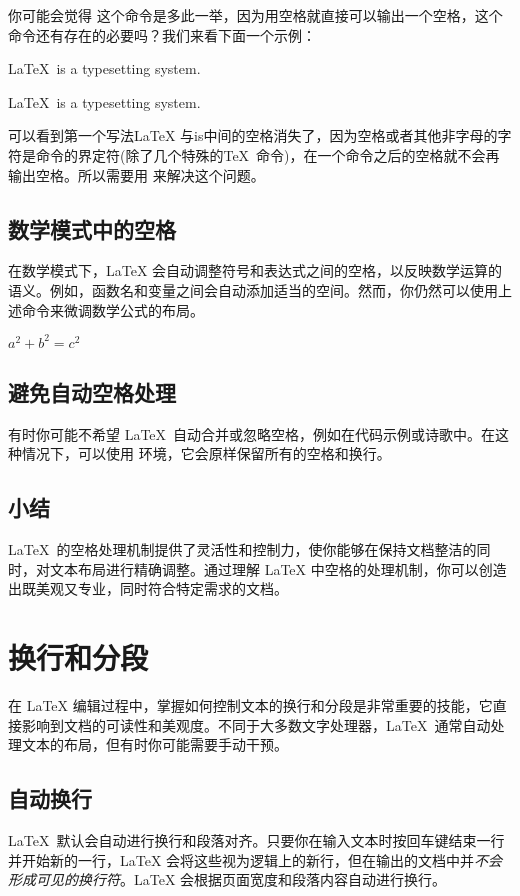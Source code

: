 {你可能会觉得\texinline{\|\textvisiblespace|} 这个命令是多此一举，因为用空格就直接可以输出一个空格，这个命令还有存在的必要吗？我们来看下面一个示例：
\begin{texlst}
	\LaTeX\ is a typesetting system.

	\LaTeX\ is a typesetting system.
\end{texlst}

可以看到第一个写法\LaTeX
与is中间的空格消失了，因为空格或者其他非字母的字符是命令的界定符(除了几个特殊的\TeX\
命令)，在一个命令之后的空格就不会再输出空格。所以需要用\texinline{\|\textvisiblespace|} 来解决这个问题。

\subsection{数学模式中的空格}
在数学模式下，LaTeX
会自动调整符号和表达式之间的空格，以反映数学运算的语义。例如，函数名和变量之间会自动添加适当的空间。然而，你仍然可以使用上述命令来微调数学公式的布局。
\begin{texlst}
$a^2+b^2=c^2$
\end{texlst}

\subsection{避免自动空格处理}
有时你可能不希望 \LaTeX\ 自动合并或忽略空格，例如在代码示例或诗歌中。在这种情况下，可以使用  环境，它会原样保留所有的空格和换行。

\subsection{小结}
\LaTeX\ 的空格处理机制提供了灵活性和控制力，使你能够在保持文档整洁的同时，对文本布局进行精确调整。通过理解 \LaTeX
中空格的处理机制，你可以创造出既美观又专业，同时符合特定需求的文档。

\section{换行和分段}
在 \LaTeX
编辑过程中，掌握如何控制文本的换行和分段是非常重要的技能，它直接影响到文档的可读性和美观度。不同于大多数文字处理器，\LaTeX\ 通常自动处理文本的布局，但有时你可能需要手动干预。
\subsection{自动换行}
\LaTeX\ 默认会自动进行换行和段落对齐。只要你在输入文本时按回车键结束一行并开始新的一行，\LaTeX
会将这些视为逻辑上的新行，但在输出的文档中并\emph{不会形成可见的换行符}。LaTeX 会根据页面宽度和段落内容自动进行换行。

}
